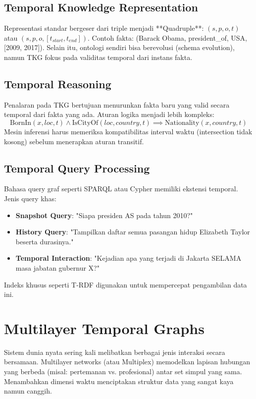 \documentclass[12pt,a4paper]{book}
\begin{document}
\section{Temporal Knowledge Representation}
Representasi standar bergeser dari triple menjadi **Quadruple**: $(s, p, o, t)$ atau $(s, p, o, [t_{start}, t_{end}])$.
Contoh fakta: (Barack Obama, president\_of, USA, [2009, 2017]).
Selain itu, ontologi sendiri bisa berevolusi (schema evolution), namun TKG fokus pada validitas temporal dari instans fakta.

\section{Temporal Reasoning}
Penalaran pada TKG bertujuan menurunkan fakta baru yang valid secara temporal dari fakta yang ada.
Aturan logika menjadi lebih kompleks:
$$ \text{BornIn}(x, loc, t) \land \text{IsCityOf}(loc, country, t) \implies \text{Nationality}(x, country, t) $$
Mesin inferensi harus memeriksa kompatibilitas interval waktu (intersection tidak kosong) sebelum menerapkan aturan transitif.

\section{Temporal Query Processing}
Bahasa query graf seperti SPARQL atau Cypher memiliki ekstensi temporal.
Jenis query khas:
\begin{itemize}
    \item \textbf{Snapshot Query}: "Siapa presiden AS pada tahun 2010?"
    \item \textbf{History Query}: "Tampilkan daftar semua pasangan hidup Elizabeth Taylor beserta durasinya."
    \item \textbf{Temporal Interaction}: "Kejadian apa yang terjadi di Jakarta SELAMA masa jabatan gubernur X?"
\end{itemize}
Indeks khusus seperti T-RDF digunakan untuk mempercepat pengambilan data ini.

\chapter{Multilayer Temporal Graphs}
Sistem dunia nyata sering kali melibatkan berbagai jenis interaksi secara bersamaan. Multilayer networks (atau Multiplex) memodelkan lapisan hubungan yang berbeda (misal: pertemanan vs. profesional) antar set simpul yang sama. Menambahkan dimensi waktu menciptakan struktur data yang sangat kaya namun canggih.
\end{document}
